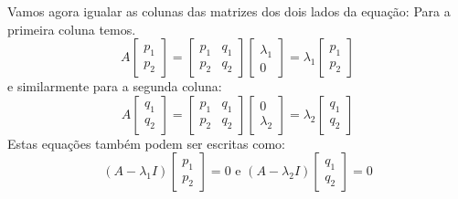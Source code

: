 \documentclass{beamer}
\begin{document}
\begin{frame}
  Vamos agora igualar as colunas das matrizes dos dois lados da equação:
  Para a primeira coluna temos.
  $$ A\begin{bmatrix}
    p_1 \\ p_2
  \end{bmatrix} = \begin{bmatrix}
    p_1 & q_1 \\ p_2 & q_2
  \end{bmatrix}\begin{bmatrix}
    \lambda_1 \\ 0
  \end{bmatrix} = \lambda_1 \begin{bmatrix}
    p_1 \\ p_2
  \end{bmatrix} $$
  e similarmente para a segunda coluna:
  $$ A \begin{bmatrix}
    q_1 \\ q_2
  \end{bmatrix} = \begin{bmatrix}
    p_1 & q_1 \\ p_2 & q_2
  \end{bmatrix}\begin{bmatrix}
    0 \\ \lambda_2
  \end{bmatrix} = \lambda_2 \begin{bmatrix}
    q_1 \\ q_2
  \end{bmatrix} $$ Estas equações também podem ser 
  escritas como:
  $$ (A - \lambda_1I) \begin{bmatrix}
    p_1 \\ p_2
  \end{bmatrix} = 0 \text{ e } (A - \lambda_2I) \begin{bmatrix}
    q_1 \\ q_2
  \end{bmatrix} = 0$$
\end{frame}
\end{document}
